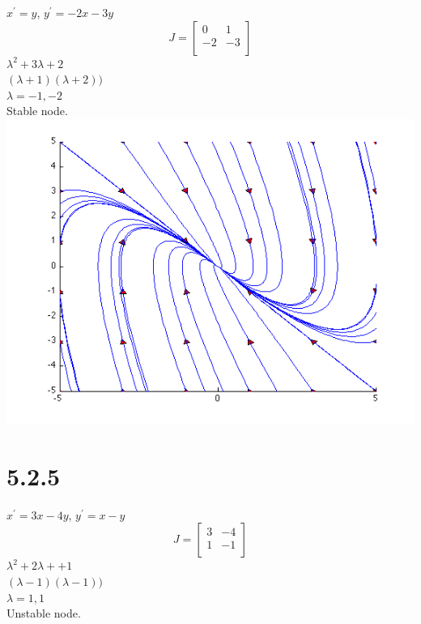 \documentclass[12pt]{article}
\begin{document}
\(x^{'} = y\), \(y^{'} = -2x - 3y\)
\begin{displaymath}
  J = \left[
    \begin{array}{cc}
    0 & 1\\
    -2 & -3\\
    \end{array}
  \right]
\end{displaymath}
\(\lambda^2 +3\lambda + 2\)\\
\((\lambda+1)(\lambda+2))\)\\
\(\lambda=-1,-2\)\\
Stable node.\\
\includegraphics[scale=.5]{5-2-3.png}

\section*{5.2.5}

\(x^{'} = 3x-4y\), \(y^{'} = x-y\)
\begin{displaymath}
  J = \left[
  \begin{array}{cc}
    3 & -4\\
    1 & -1\\
    \end{array}
  \right]
\end{displaymath}
\(\lambda^2 + 2\lambda + +1\)\\
\((\lambda-1)(\lambda-1))\)\\
\(\lambda = 1,1\)\\
Unstable node.\\
\end{document}
